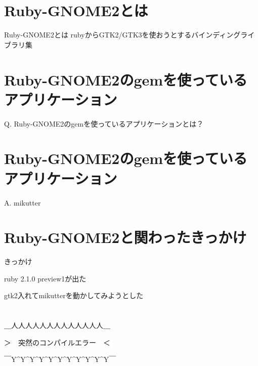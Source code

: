 \section{Ruby-GNOME2とは}
\begin{frame}
\begin{block}{Ruby-GNOME2とは}
{\huge
rubyからGTK2/GTK3を使おうとするバインディングライブラリ集
}
\end{block}
\end{frame}

\section{Ruby-GNOME2のgemを使っているアプリケーション}
\begin{frame}
\begin{block}{}
{\huge
Q. Ruby-GNOME2のgemを使っているアプリケーションとは？
}
\end{block}
\end{frame}

\section{Ruby-GNOME2のgemを使っているアプリケーション}
\begin{frame}
\begin{block}{}
{\huge
A. mikutter
}
\end{block}
\end{frame}

\section{Ruby-GNOME2と関わったきっかけ}
\begin{frame}
\begin{block}{きっかけ}
\begin{itemize}
{\Large
\item ruby 2.1.0 preview1が出た
\item gtk2入れてmikutterを動かしてみようとした
}
\end{itemize}
\end{block}
\end{frame}

\section{}

\begin{frame}
\begin{center}
{\huge
＿人人人人人人人人人人人人人＿

＞　突然のコンパイルエラー　＜

￣Y\^{}Y\^{}Y\^{}Y\^{}Y\^{}Y\^{}Y\^{}Y\^{}Y\^{}Y\^{}Y￣
}
\end{center}
\end{frame}

